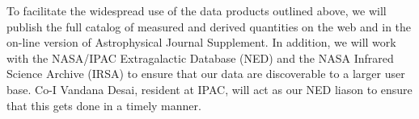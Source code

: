 \documentclass[11pt,preprint]{aastex}
\begin{document}
To facilitate the widespread use of the data products outlined above, we will publish the full catalog of measured and derived quantities on the web and in the on-line version of Astrophysical Journal Supplement. In addition, we will work with the NASA/IPAC Extragalactic Database (NED) and the NASA Infrared Science Archive (IRSA) to ensure that our data are discoverable to a larger user base. Co-I Vandana Desai, resident at IPAC, will act as our NED liason to ensure that this gets done in a timely manner.
\end{document}
